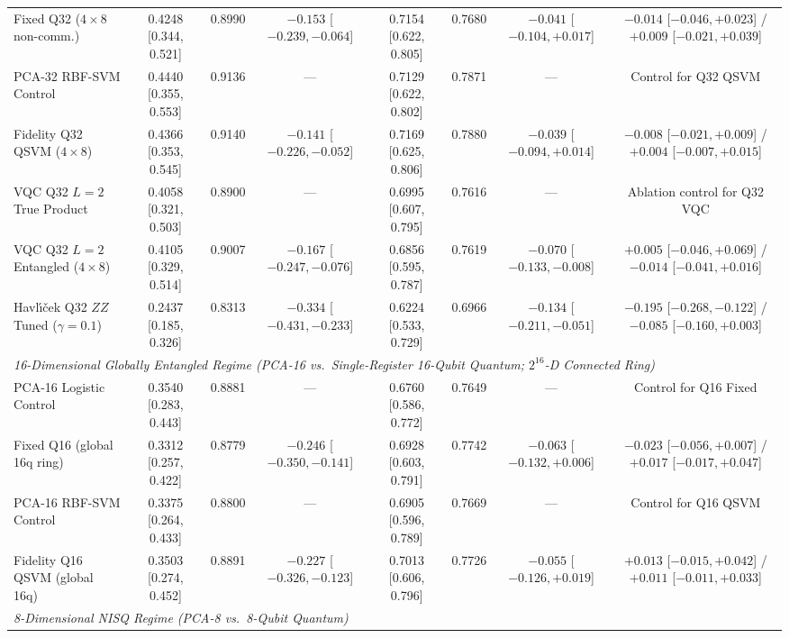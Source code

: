 \documentclass[conference]{IEEEtran}
\begin{document}
\begin{table}[!t]
{\begin{tabular}{lccccccc}
Fixed Q32 ($4 \times 8$ non-comm.) & 0.4248 [0.344, 0.521] & 0.8990 & $-0.153$ [$-0.239, -0.064$] & 0.7154 [0.622, 0.805] & 0.7680 & $-0.041$ [$-0.104, +0.017$] & $-0.014$ [$-0.046, +0.023$] / $+0.009$ [$-0.021, +0.039$] \\
PCA-32 RBF-SVM Control & 0.4440 [0.355, 0.553] & 0.9136 & --- & 0.7129 [0.622, 0.802] & 0.7871 & --- & Control for Q32 QSVM \\
Fidelity Q32 QSVM ($4 \times 8$) & 0.4366 [0.353, 0.545] & 0.9140 & $-0.141$ [$-0.226, -0.052$] & 0.7169 [0.625, 0.806] & 0.7880 & $-0.039$ [$-0.094, +0.014$] & $-0.008$ [$-0.021, +0.009$] / $+0.004$ [$-0.007, +0.015$] \\
VQC Q32 $L=2$ True Product & 0.4058 [0.321, 0.503] & 0.8900 & --- & 0.6995 [0.607, 0.795] & 0.7616 & --- & Ablation control for Q32 VQC \\
VQC Q32 $L=2$ Entangled ($4 \times 8$) & 0.4105 [0.329, 0.514] & 0.9007 & $-0.167$ [$-0.247, -0.076$] & 0.6856 [0.595, 0.787] & 0.7619 & $-0.070$ [$-0.133, -0.008$] & $+0.005$ [$-0.046, +0.069$] / $-0.014$ [$-0.041, +0.016$] \\
Havl{\'\i}{\v{c}}ek Q32 $ZZ$ Tuned ($\gamma=0.1$) & 0.2437 [0.185, 0.326] & 0.8313 & $-0.334$ [$-0.431, -0.233$] & 0.6224 [0.533, 0.729] & 0.6966 & $-0.134$ [$-0.211, -0.051$] & $-0.195$ [$-0.268, -0.122$] / $-0.085$ [$-0.160, +0.003$] \\
\midrule
\multicolumn{8}{l}{\emph{16-Dimensional Globally Entangled Regime (PCA-16 vs.\ Single-Register 16-Qubit Quantum; $2^{16}$-D Connected Ring)}} \\
PCA-16 Logistic Control & 0.3540 [0.283, 0.443] & 0.8881 & --- & 0.6760 [0.586, 0.772] & 0.7649 & --- & Control for Q16 Fixed \\
Fixed Q16 (global 16q ring) & 0.3312 [0.257, 0.422] & 0.8779 & $-0.246$ [$-0.350, -0.141$] & 0.6928 [0.603, 0.791] & 0.7742 & $-0.063$ [$-0.132, +0.006$] & $-0.023$ [$-0.056, +0.007$] / $+0.017$ [$-0.017, +0.047$] \\
PCA-16 RBF-SVM Control & 0.3375 [0.264, 0.433] & 0.8800 & --- & 0.6905 [0.596, 0.789] & 0.7669 & --- & Control for Q16 QSVM \\
Fidelity Q16 QSVM (global 16q) & 0.3503 [0.274, 0.452] & 0.8891 & $-0.227$ [$-0.326, -0.123$] & 0.7013 [0.606, 0.796] & 0.7726 & $-0.055$ [$-0.126, +0.019$] & $+0.013$ [$-0.015, +0.042$] / $+0.011$ [$-0.011, +0.033$] \\
\midrule
\multicolumn{8}{l}{\emph{8-Dimensional NISQ Regime (PCA-8 vs.\ 8-Qubit Quantum)}} \\

\end{tabular}}
\end{table}
\end{document}
